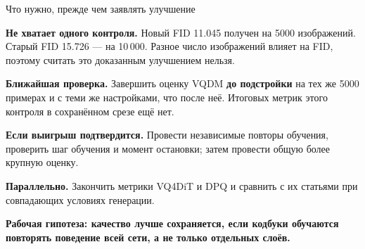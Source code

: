 \documentclass[aspectratio=1610,11pt]{beamer}
\renewcommand{\fact}[2]{\par\textcolor{Accent}{\textbf{#1.}} #2\par}
\newcommand{\finding}[1]{\par\vspace{.5mm}\textbf{#1}\par}
\begin{document}
\begin{frame}[t]{Что нужно, прежде чем заявлять улучшение}
  \fact{Не хватает одного контроля}{Новый FID 11.045 получен на 5000 изображений.
  Старый FID 15.726 --- на 10\,000. Разное число изображений влияет на FID,
  поэтому считать это доказанным улучшением нельзя.}
  \fact{Ближайшая проверка}{Завершить оценку VQDM \textbf{до подстройки}
  на тех же 5000 примерах и с теми же настройками, что после неё.
  Итоговых метрик этого контроля в сохранённом срезе ещё нет.}
  \fact{Если выигрыш подтвердится}{Провести независимые повторы обучения,
  проверить шаг обучения и момент остановки;
  затем провести общую более крупную оценку.}
  \fact{Параллельно}{Закончить метрики VQ4DiT и DPQ и сравнить с их статьями
  при совпадающих условиях генерации.}
  \finding{Рабочая гипотеза: качество лучше сохраняется, если кодбуки обучаются
  повторять поведение всей сети, а не только отдельных слоёв.}
\end{frame}
\end{document}
